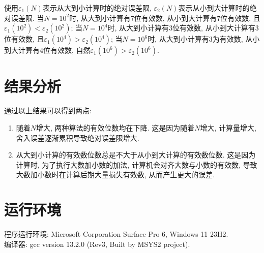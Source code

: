 \documentclass{ctexart}
\begin{document}
使用$\varepsilon_1(N)$表示从大到小计算时的绝对误差限, $\varepsilon_2(N)$表示从小到大计算时的绝对误差限.
当$N=10^2$时, 从大到小计算有$7$位有效数, 从小到大计算有$7$位有效数, 且$\varepsilon_1(10^2)<\varepsilon_2(10^2)$;
当$N=10^4$时, 从大到小计算有$3$位有效数, 从小到大计算有$3$位有效数, 且$\varepsilon_1(10^4)>\varepsilon_2(10^4)$;
当$N=10^6$时, 从大到小计算有$3$为有效数, 从小到大计算有$4$位有效数, 自然$\varepsilon_1(10^6)>\varepsilon_2(10^6)$.

\section{结果分析}
通过以上结果可以得到两点:
\begin{enumerate}
    \item 随着$N$增大, 两种算法的有效位数均在下降.
    这是因为随着$N$增大, 计算量增大, 舍入误差逐渐累积导致绝对误差限增大.
    \item 从大到小计算的有效数位数总是不大于从小到大计算的有效数位数.
    这是因为计算时, 为了执行大数加小数的加法, 计算机会对齐大数与小数的有效数, 导致大数加小数时在计算后期大量损失有效数, 从而产生更大的误差.
\end{enumerate}


\section{运行环境}
\noindent 程序运行环境: Microsoft Corporation Surface Pro 6, Windows 11 23H2.\\
编译器: gcc version 13.2.0 (Rev3, Built by MSYS2 project).
\end{document}
